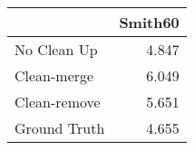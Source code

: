 \begin{tabular}{lr}
\toprule
{} & Smith60 \\
\midrule
No Clean Up  &   4.847 \\
Clean-merge  &   6.049 \\
Clean-remove &   5.651 \\
Ground Truth &   4.655 \\
\bottomrule
\end{tabular}
